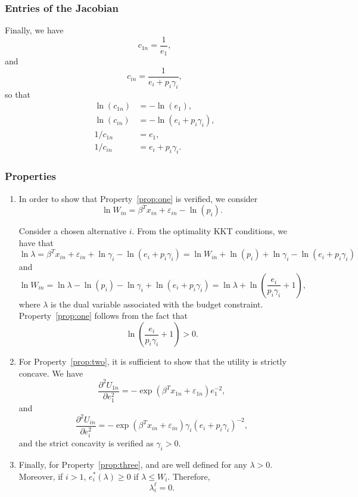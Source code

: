 \documentclass[12pt,a4paper]{article}
\begin{document}
\subsubsection*{Entries of the Jacobian}
Finally, we have
\[
c_{1n} = \frac{1}{e_1},
\]
and
\[
c_{in} = \frac{1}{e_i + p_i \gamma_i},
\]
so that
\begin{align*}
    \ln(c_{1n}) &= -\ln(e_1), \\
    \ln(c_{in}) &= -\ln(e_i + p_i \gamma_i), \\
    1/c_{1n} &= e_1, \\
    1/c_{in} &= e_i + p_i \gamma_i.
\end{align*}

\subsubsection*{Properties}

\begin{enumerate}
\item In order to show that Property~\ref{prop:one} is verified, we consider
\[
    \ln W_{in}  =\beta^T x_{in} + \varepsilon_{in} -\ln(p_i).
\]


Consider a chosen alternative $i$. From the optimality KKT conditions, we have that
\[
   \ln \lambda =\beta^T x_{in}+ \varepsilon_{in} + \ln \gamma_i - \ln(e_i + p_i \gamma_i) = \ln W_{in}+\ln(p_i) +\ln \gamma_i - \ln(e_i + p_i \gamma_i)
\]
and
\[
    \ln W_{in} =\ln \lambda  -\ln(p_i) -\ln \gamma_i + \ln(e_i + p_i \gamma_i) = \ln \lambda + \ln\left(\frac{e_i}{p_i\gamma_i}+1\right),
\]
where $\lambda$ is the dual variable associated with the budget constraint.
Property~\ref{prop:one} follows from the fact that
\[
     \ln\left(\frac{e_i}{p_i\gamma_i}+1\right)> 0.
\]
\item For Property~\ref{prop:two}, it is sufficient to show that the utility is strictly concave.
We have
\[
    \frac{\partial^2 U_{1n}}{\partial e_1^2} = -\exp(\beta^T x_{1n} + \varepsilon_{1n}) e_1^{-2},
\]
and
\[
    \frac{\partial^2 U_{in}}{\partial e_i^2} = -\exp(\beta^T x_{in} + \varepsilon_{in}) \gamma_i(e_i + p_i \gamma_i)^{-2},
\]
and the strict concavity is verified as $\gamma_i > 0$.
\item Finally, for Property~\ref{prop:three},  and  are well defined for any $\lambda > 0$. Moreover,
    if $i>1$, $e_i^*(\lambda) \geq 0$ if $\lambda \leq W_i$. Therefore,
\[
              \lambda^\ell_i = 0.
\]
\end{enumerate}
\end{document}
